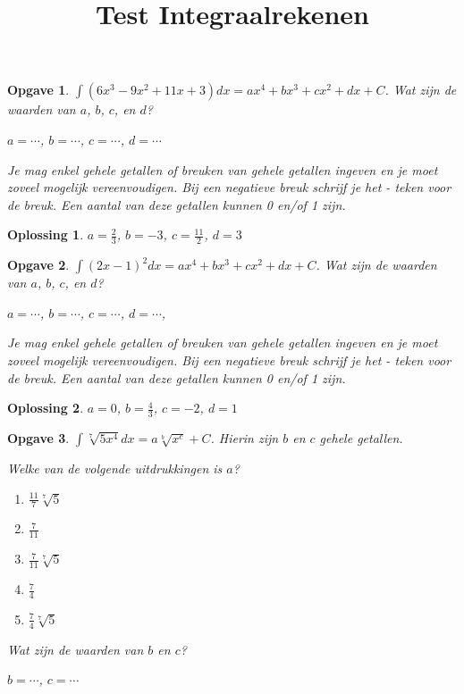 \documentclass{article}
\title{Test Integraalrekenen}
\date { }
\newtheorem{opgave}{Opgave}
\newtheorem*{oplossing}{Oplossing}
\begin{document}
\maketitle \noindent

\begin{opgave}
$\int (6x^3-9x^2+11x+3)dx=ax^4+bx^3+cx^2+dx+C$. Wat zijn de waarden van $a$, $b$, $c$, en $d$?\vspace{2mm}

\noindent $a= \cdots$, $b=\cdots$, $c=\cdots$, $d=\cdots$\vspace{1mm}

\noindent Je mag enkel gehele getallen of breuken van gehele getallen ingeven en je moet zoveel mogelijk vereenvoudigen. Bij een negatieve breuk schrijf je het - teken voor de breuk. Een aantal van deze getallen kunnen 0 en/of 1 zijn.
\end{opgave}

\begin{oplossing}
$a=\frac{2}{3}$, $b=-3$, $c=\frac{11}{2}$, $d=3$
\end{oplossing}

\begin{opgave}
$\int (2x-1)^2 dx = ax^4+bx^3+cx^2+dx+C$. Wat zijn de waarden van $a$, $b$, $c$, en $d$?\vspace{2mm}

\noindent $a= \cdots$, $b=\cdots$, $c=\cdots$, $d=\cdots$, \vspace{1mm}

\noindent Je mag enkel gehele getallen of breuken van gehele getallen ingeven en je moet zoveel mogelijk vereenvoudigen. Bij een negatieve breuk schrijf je het - teken voor de breuk. Een aantal van deze getallen kunnen 0 en/of 1 zijn.
\end{opgave}

\begin{oplossing}
$a=0$, $b=\frac{4}{3}$, $c=-2$, $d=1$
\end{oplossing}

\begin{opgave}
$\int \sqrt[7]{5x^4}dx = a \sqrt[b]{x^c} +C$.
Hierin zijn $b$ en $c$ gehele getallen.

\noindent Welke van de volgende uitdrukkingen is $a$?

\begin{enumerate}
\item $\frac{11}{7} \sqrt[7]{5}$
\item $\frac{7}{11}$
\item $\frac{7}{11} \sqrt[7]{5}$
\item $\frac{7}{4}$
\item $\frac{7}{4}\sqrt[7]{5}$
\end{enumerate}

\noindent Wat zijn de waarden van $b$ en $c$?

\noindent $b=\cdots$, $c=\cdots$ \vspace{1mm}


\end{opgave}
\end{document}
